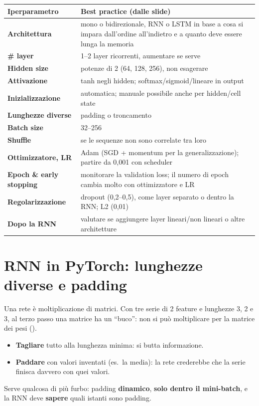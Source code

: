 \begin{center}
\small
\renewcommand{\arraystretch}{1.2}
\begin{tabularx}{\textwidth}{>{\bfseries}l X}
\toprule
Iperparametro & Best practice (dalle slide)\\
\midrule
Architettura & mono o bidirezionale, RNN o LSTM in base a cosa si impara dall'ordine all'indietro e a quanto deve essere lunga la memoria\\
\# layer & 1--2 layer ricorrenti, aumentare se serve\\
Hidden size & potenze di 2 (64, 128, 256), non esagerare\\
Attivazione & tanh negli hidden; softmax/sigmoid/lineare in output\\
Inizializzazione & automatica; manuale possibile anche per hidden/cell state\\
Lunghezze diverse & padding o troncamento\\
Batch size & 32--256\\
Shuffle & se le sequenze non sono correlate tra loro\\
Ottimizzatore, LR & Adam (SGD + momentum per la generalizzazione); partire da 0,001 con scheduler\\
Epoch \& early stopping & monitorare la validation loss; il numero di epoch cambia molto con ottimizzatore e LR\\
Regolarizzazione & dropout (0,2--0,5), come layer separato o dentro la RNN; L2 (0,01)\\
Dopo la RNN & valutare se aggiungere layer lineari/non lineari o altre architetture\\
\bottomrule
\end{tabularx}
\end{center}

\section{RNN in PyTorch: lunghezze diverse e padding}
\label{sec:rnn-padding}
Una rete è moltiplicazione di matrici. Con tre serie di 2 feature e lunghezze 3, 2 e 3, al terzo passo una matrice ha un
``buco'': non si può moltiplicare per la matrice dei pesi ().
\begin{itemize}
  \item \textbf{Tagliare} tutto alla lunghezza minima: si butta informazione.
  \item \textbf{Paddare} con valori inventati (es.\ la media): la rete crederebbe che la serie finisca davvero con quei valori.
\end{itemize}
Serve qualcosa di più furbo: padding \textbf{dinamico}, \textbf{solo dentro il mini-batch}, e la RNN deve \textbf{sapere} quali
istanti sono padding.

